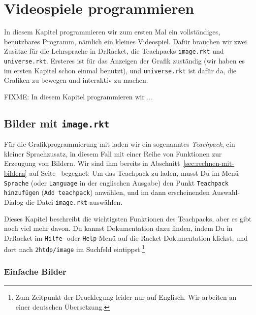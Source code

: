 
\chapter{Videospiele programmieren}
\label{cha:representation-and-state}

In diesem Kapitel programmieren wir zum ersten Mal ein vollständiges,
benutzbares Programm, nämlich ein kleines Videospiel.  Dafür brauchen
wir zwei Zusätze für die Lehrsprache in DrRacket, die Teachpacks
\texttt{image.rkt} und \texttt{universe.rkt}.  Ersteres ist für das
Anzeigen der Grafik zuständig (wir haben es im ersten Kapitel schon
einmal benutzt), und \texttt{universe.rkt} ist dafür da, die Grafiken
zu bewegen und interaktiv zu machen.

FIXME: In diesem Kapitel programmieren wir ...

\section{Bilder mit \texttt{image.rkt}}

Für die Grafikprogrammierung mit \drscheme{} laden wir ein sogenanntes
\textit{Teachpack}, ein kleiner Sprachzusatz, in
diesem Fall mit einer Reihe von Funktionen zur Erzeugung von Bildern.
Wir sind ihm bereits in Abschnitt~\ref{sec:rechnen-mit-bildern} auf
Seite~\pageref{sec:rechnen-mit-bildern} begegnet: Um das Teachpack zu
laden, musst Du im Menü \texttt{Sprache} (oder \texttt{Language} in
der englischen Ausgabe) den Punkt \texttt{Teachpack hinzufügen}
(\texttt{Add teachpack}) anwählen, und im dann erscheinenden
Auswahl-Dialog die Datei
\texttt{image.rkt} auswählen.

Dieses Kapitel beschreibt die wichtigsten Funktionen des Teachpacks,
aber es gibt noch viel mehr davon.  Du kannst Dokumentation dazu
finden, indem Du in DrRacket im \texttt{Hilfe}- oder \texttt{Help}-Menü
auf die Racket-Dokumentation klickst, und dort nach
\texttt{2htdp/image} im Suchfeld eintippst.\footnote{Zum Zeitpunkt der
  Drucklegung leider nur auf Englisch.  Wir arbeiten an einer
  deutschen Übersetzung.}

\subsection{Einfache Bilder}

